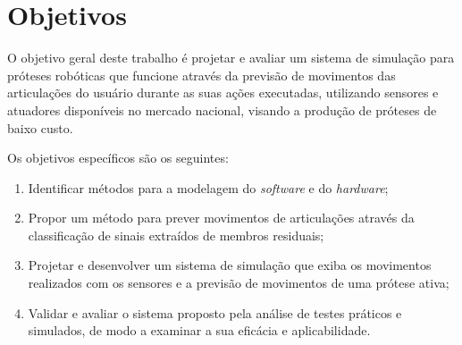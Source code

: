 \section{Objetivos}\label{sec:objetivos}

O objetivo geral deste trabalho é projetar e avaliar um sistema de simulação para próteses robóticas que funcione através da previsão de movimentos das articulações do usuário durante as suas ações executadas, 
utilizando sensores e atuadores disponíveis no mercado nacional, visando a produção de próteses de baixo custo.

Os objetivos específicos são os seguintes:
\begin{enumerate}
  \item Identificar métodos para a modelagem do \textit{software} e do \textit{hardware};
  \item Propor um método para prever movimentos de articulações através da classificação de sinais extraídos de membros residuais;
  \item Projetar e desenvolver um sistema de simulação que exiba os movimentos realizados com os sensores e a previsão de movimentos de uma prótese ativa;
  \item Validar e avaliar o sistema proposto pela análise de testes práticos e simulados, de modo a examinar a sua eficácia e aplicabilidade.
\end{enumerate}

